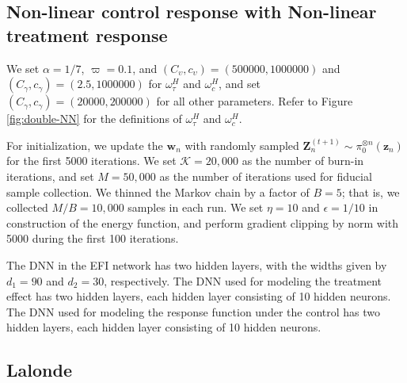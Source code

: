 \documentclass[11pt]{article}
\newcommand{\bz}{{\boldsymbol z}}
\newcommand{\bZ}{{\boldsymbol Z}}
\newcommand{\bw}{{\boldsymbol w}}
\newcommand{\mK}{\mathcal{K}}
\begin{document}
\subsection{Non-linear control response with Non-linear treatment response}


We set $\alpha=1/7$, $\varpi=0.1$, and 
$(C_{\upsilon},c_{\upsilon})=(500000,1000000)$ and $(C_{\gamma},c_{\gamma})=(2.5,1000000)$ for $\omega^{H}_{\tau}$ and $\omega_{c}^H$, and set $(C_{\gamma},c_{\gamma})=(20000,200000)$ for all other parameters. Refer to  Figure \ref{fig:double-NN} for the definitions of $\omega_{\tau}^H$ and $\omega_c^H$.
 
 For initialization, we update the $\bw_n$ with randomly sampled $\bZ_n^{(t+1)}\sim \pi_0^{\otimes n}(\bz_n)$ for the first 5000 iterations. We set $\mK=20,000$ as the number of burn-in iterations, and set $M=50,000$ as the number of iterations used for fiducial sample collection. We thinned the Markov chain by a factor of $B=5$; that is, we collected $M/B=10,000$ samples in each run. We set $\eta=10$ and $\epsilon=1/10$ in construction of the energy function, and perform gradient clipping by norm with 5000 during the first 100 iterations. 


 The DNN in the EFI network has two hidden layers,  with the widths given by $d_1=90$ and $d_2=30$, respectively. The DNN used for modeling the treatment effect has two hidden layers, each hidden layer consisting of 10 hidden neurons. 
 The DNN used for modeling the response function under the control has two hidden layers, each hidden layer consisting of 10 hidden neurons. 





 



\subsection{Lalonde}
\end{document}
